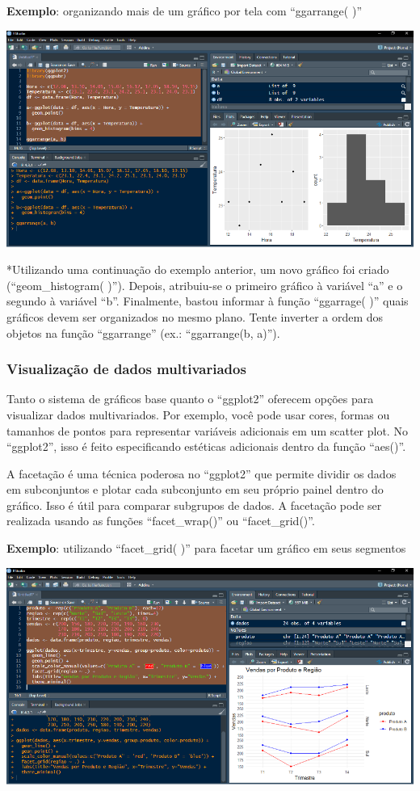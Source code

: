 \documentclass[
]{book}
\begin{document}
\textbf{Exemplo}: organizando mais de um gráfico por tela com ``ggarrange( )''

\includegraphics{images/clipboard-469555772.png}

*Utilizando uma continuação do exemplo anterior, um novo gráfico foi criado (``geom\_histogram( )''). Depois, atribuiu-se o primeiro gráfico à variável ``a'' e o segundo à variável ``b''. Finalmente, bastou informar à função ``ggarrage( )'' quais gráficos devem ser organizados no mesmo plano. Tente inverter a ordem dos objetos na função ``ggarrange'' (ex.: ``ggarrange(b, a)'').

\subsubsection{Visualização de dados multivariados}\label{visualizauxe7uxe3o-de-dados-multivariados}

Tanto o sistema de gráficos base quanto o ``ggplot2'' oferecem opções para visualizar dados multivariados. Por exemplo, você pode usar cores, formas ou tamanhos de pontos para representar variáveis adicionais em um scatter plot. No ``ggplot2'', isso é feito especificando estéticas adicionais dentro da função ``aes()''.

A facetação é uma técnica poderosa no ``ggplot2'' que permite dividir os dados em subconjuntos e plotar cada subconjunto em seu próprio painel dentro do gráfico. Isso é útil para comparar subgrupos de dados. A facetação pode ser realizada usando as funções ``facet\_wrap()'' ou ``facet\_grid()''.

\textbf{Exemplo}: utilizando ``facet\_grid( )'' para facetar um gráfico em seus segmentos

\includegraphics{images/clipboard-928999128.png}
\end{document}
